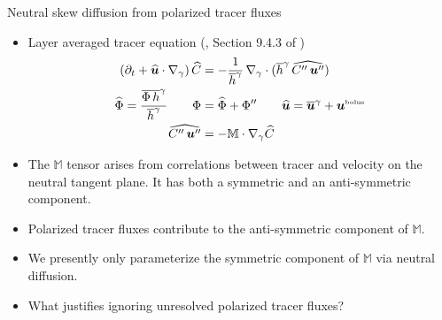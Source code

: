 \documentclass{beamer}
\begin{document}
\begin{frame}{Neutral skew diffusion from polarized tracer fluxes}

\begin{itemize}

\item[$\star$] Layer averaged tracer equation (\textcite{Smith1999},
  Section 9.4.3 of \textcite{SMGbook})
\begin{align}
 (\partial_{t} + \widehat{\bm u} \cdot \nabla_{\gamma} ) \,  \widehat{C}
 &= -\frac{1}{\overline{h}^{\gamma}} \, 
   \nabla_{\gamma} \cdot (\overline{h}^{\gamma} 
   \, \widehat{C'' \, {\bm u}''})
  \\
  \widehat{\Phi} = \frac{\overline{\Phi \, h}^{\gamma}}{\overline{h}^{\gamma}}
  \qquad \Phi &= \widehat{\Phi} + \Phi'' 
\qquad
\widehat{\bm u} = \overline{\bm u}^{\gamma} + {\bm u}^{\mbox{\tiny bolus}}
  \\
  \widehat{C'' \, {\bm u}''} 
  &= - \mathbb{M} \cdot \nabla_{\gamma} \widehat{C}
\label{eq:thickness-tracer-evolution}
\end{align}

\item[$\star$] The $\mathbb{M}$ tensor arises from correlations
  between tracer and velocity on the neutral tangent plane.  It has
  both a symmetric and an anti-symmetric component.

\item[$\star$] Polarized tracer fluxes \parencite{MiddletonLoder1989}
  contribute to the anti-symmetric component of $\mathbb{M}$.

\item[$\star$] We presently only parameterize the symmetric component
  of $\mathbb{M}$ via neutral diffusion.

\item[$\star$] What justifies ignoring unresolved polarized tracer
  fluxes?
  
\end{itemize}


\end{frame}
\end{document}

